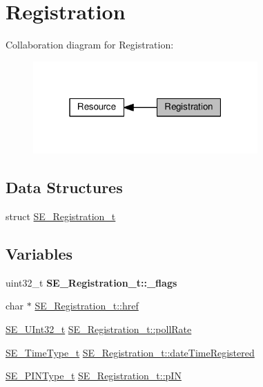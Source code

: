 \hypertarget{group__Registration}{}\section{Registration}
\label{group__Registration}
Collaboration diagram for Registration\+:\nopagebreak
\begin{figure}[H]
\begin{center}
\leavevmode
\includegraphics[width=244pt]{group__Registration}
\end{center}
\end{figure}
\subsection*{Data Structures}
\begin{DoxyCompactItemize}
\item 
struct \hyperlink{structSE__Registration__t}{S\+E\+\_\+\+Registration\+\_\+t}
\end{DoxyCompactItemize}
\subsection*{Variables}
\begin{DoxyCompactItemize}
\item 
\mbox{\label{group__Registration_ga788bddcd4b3b1df80e599abdcf73a870}} 
uint32\+\_\+t {\bfseries S\+E\+\_\+\+Registration\+\_\+t\+::\+\_\+flags}
\item 
char $\ast$ \hyperlink{group__Registration_ga76fcf14a2f87084c2513efdfe08f25b5}{S\+E\+\_\+\+Registration\+\_\+t\+::href}
\item 
\hyperlink{group__UInt32_ga70bd4ecda3c0c85d20779d685a270cdb}{S\+E\+\_\+\+U\+Int32\+\_\+t} \hyperlink{group__Registration_ga7168a63281b2883dea8ab4f1366e854b}{S\+E\+\_\+\+Registration\+\_\+t\+::poll\+Rate}
\item 
\hyperlink{group__TimeType_ga6fba87a5b57829b4ff3f0e7638156682}{S\+E\+\_\+\+Time\+Type\+\_\+t} \hyperlink{group__Registration_gabd2cd11ffd9eed1da4ff688b6be28b19}{S\+E\+\_\+\+Registration\+\_\+t\+::date\+Time\+Registered}
\item 
\hyperlink{group__PINType_ga30be98f3ca9ec3c8261d0bb63307bc85}{S\+E\+\_\+\+P\+I\+N\+Type\+\_\+t} \hyperlink{group__Registration_ga81325290ed2a058059fb75d933c159ae}{S\+E\+\_\+\+Registration\+\_\+t\+::p\+IN}
\end{DoxyCompactItemize}


